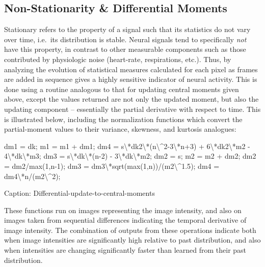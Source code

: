 \documentclass[
  12pt,
]{report}
\newenvironment{Shaded}{}{}
\newcommand{\FloatTok}[1]{\textcolor[rgb]{0.25,0.63,0.44}{#1}}
\newcommand{\NormalTok}[1]{#1}
\numberwithin{figure}{section}
\numberwithin{table}{section}
\numberwithin{equations}{section}
\begin{document}
\hypertarget{non-stationarity-differential-moments}{%
\subsection{Non-Stationarity \& Differential
Moments}\label{non-stationarity-differential-moments}}

Stationary refers to the property of a signal such that its statistics
do not vary over time, i.e.~its distribution is stable. Neural signals
tend to specifically \emph{not} have this property, in contrast to other
measurable components such as those contributed by physiologic noise
(heart-rate, respirations, etc.). Thus, by analyzing the evolution of
statistical measures calculated for each pixel as frames are added in
sequence gives a highly sensitive indicator of neural activity. This is
done using a routine analogous to that for updating central moments
given above, except the values returned are not only the updated moment,
but also the updating component -- essentially the partial derivative
with respect to time. This is illustrated below, including the
normalization functions which convert the partial-moment values to their
variance, skewness, and kurtosis analogues:

\begin{Shaded}
\begin{Highlighting}[]
\NormalTok{dm1 = dk;}
\NormalTok{m1 = m1 + dm1;}
\NormalTok{dm4 = s\textbackslash{}*dk2\textbackslash{}*(n\textbackslash{}^}\FloatTok{2}\NormalTok{-}\FloatTok{3}\NormalTok{\textbackslash{}*n+}\FloatTok{3}\NormalTok{) + }\FloatTok{6}\NormalTok{\textbackslash{}*dk2\textbackslash{}*m2 - }\FloatTok{4}\NormalTok{\textbackslash{}*dk\textbackslash{}*m3;}
\NormalTok{dm3 = s\textbackslash{}*dk\textbackslash{}*(n-}\FloatTok{2}\NormalTok{) - }\FloatTok{3}\NormalTok{\textbackslash{}*dk\textbackslash{}*m2;}
\NormalTok{dm2 = s;}
\NormalTok{m2 = m2 + dm2;}
\NormalTok{dm2 = dm2/max(}\FloatTok{1}\NormalTok{,n-}\FloatTok{1}\NormalTok{);}
\NormalTok{dm3 = dm3\textbackslash{}*sqrt(max(}\FloatTok{1}\NormalTok{,n))/(m2\textbackslash{}^}\FloatTok{1.5}\NormalTok{);}
\NormalTok{dm4 = dm4\textbackslash{}*n/(m2\textbackslash{}^}\FloatTok{2}\NormalTok{);}
\end{Highlighting}
\end{Shaded}

Caption: Differential-update-to-central-moments

These functions run on images representing the image intensity, and also
on images taken from sequential differences indicating the temporal
derivative of image intensity. The combination of outputs from these
operations indicate both when image intensities are significantly high
relative to past distribution, and also when intensities are changing
significantly faster than learned from their past distribution.
\end{document}
